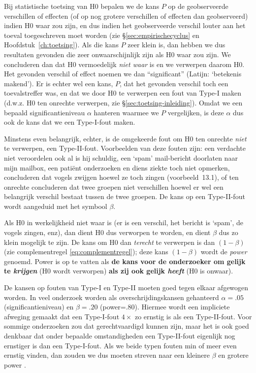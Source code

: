 \documentclass[
]{book}
\begin{document}
Bij statistische toetsing van H0 bepalen we de kans \(P\) op de
geobserveerde verschillen of effecten (of op nog grotere verschillen of
effecten dan geobserveerd) indien H0 waar zou zijn, en dus indien het
geobserveerde verschil louter aan het toeval toegeschreven moet worden
(zie §\ref{sec:empirischecyclus} en
Hoofdstuk~\ref{ch:toetsing}). Als die kans \(P\) zeer klein is, dan hebben we
dus resultaten gevonden die zeer onwaarschijnlijk zijn als H0 waar zou
zijn. We concluderen dan dat H0 vermoedelijk \emph{niet waar} is en we
verwerpen daarom H0. Het gevonden verschil of effect noemen we dan
``significant'' (Latijn: `betekenis makend'). Er is echter wel een kans,
\(P\), dat het gevonden verschil toch een toevalstreffer was, en dat we
door H0 te verwerpen een fout van Type-I maken (d.w.z. H0 ten onrechte
verwerpen, zie
§\ref{sec:toetsing-inleiding}). Omdat we een bepaald
significantieniveau \(\alpha\) hanteren waarmee we \(P\) vergelijken, is
deze \(\alpha\) dus ook de kans dat we een Type-I-fout maken.

Minstens even belangrijk, echter, is de omgekeerde fout om H0 ten
onrechte \emph{niet} te verwerpen, een Type-II-fout. Voorbeelden van deze
fouten zijn: een verdachte niet veroordelen ook al is hij schuldig, een
`spam' mail-bericht doorlaten naar mijn mailbox, een patiënt onderzoeken
en diens ziekte toch niet opmerken, concluderen dat vogels zwijgen
hoewel ze toch zingen
(voorbeeld~13.1), of ten onrechte concluderen dat twee
groepen niet verschillen hoewel er wel een belangrijk verschil bestaat
tussen de twee groepen. De kans op een Type-II-fout wordt aangeduid met
het symbool \(\beta\).

Als H0 in werkelijkheid niet waar is (er is een verschil, het bericht is
`spam', de vogels zingen, enz), dan dient H0 dus verworpen te worden, en
dient \(\beta\) dus zo klein mogelijk te zijn. De kans om H0 dan \emph{terecht}
te verwerpen is dan \((1-\beta)\) (zie complementregel \eqref{eq:complementregel});
deze kans \((1-\beta)\) wordt de \emph{power}
genoemd. Power is op te vatten als \textbf{de kans voor de onderzoeker om gelijk
te \emph{krijgen}} (H0 wordt verworpen) \textbf{als zij ook gelijk \emph{heeft}} (H0 is onwaar).

De kansen op fouten van Type-I en Type-II moeten goed tegen elkaar
afgewogen worden. In veel onderzoek worden als overschrijdingskansen
gehanteerd \(\alpha=.05\) (significantieniveau) en \(\beta=.20\)
(power=\(.80\)). Hiermee wordt een impliciete afweging gemaakt dat een
Type-I-fout \(4\times\) zo ernstig is als een Type-II-fout. Voor sommige
onderzoeken zou dat gerechtvaardigd kunnen zijn, maar het is ook goed
denkbaar dat onder bepaalde omstandigheden een Type-II-fout eigenlijk
nog ernstiger is dan een Type-I-fout. Als we beide typen fouten min of
meer even ernstig vinden, dan zouden we dus moeten streven naar een
kleinere \(\beta\) en grotere power \citep{Rose08}.
\end{document}
